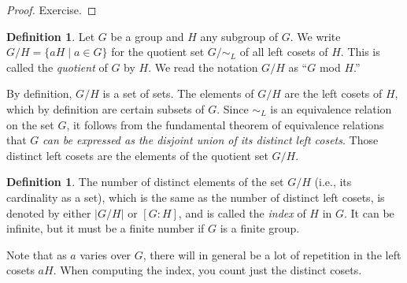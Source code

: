 \documentclass[11pt,oneside]{article}
\theoremstyle{definition}
\newtheorem{defn}[thm]{Definition}
\begin{document}
\begin{proof} 
  Exercise.
\end{proof}

\begin{defn}
Let $G$ be a group and $H$ any subgroup of $G$. We write $G/H = \{ aH
\mid a \in G \}$ for the quotient set $G/\!\!\sim_L$ of all left
cosets of $H$. This is called the \emph{quotient} of $G$ by $H$. We
read the notation $G/H$ as ``$G$ mod $H$.''
\end{defn}

By definition, $G/H$ is a set of sets. The elements of $G/H$ are the
left cosets of $H$, which by definition are certain subsets of $G$.
Since $\sim_L$ is an equivalence relation on the set $G$, it follows
from the fundamental theorem of equivalence relations that $G$
\emph{can be expressed as the disjoint union of its distinct left
  cosets}. Those distinct left cosets are the elements of the quotient
set $G/H$.


\begin{defn}
The number of distinct elements of the set $G/H$ (i.e., its
cardinality as a set), which is the same as the number of distinct
left cosets, is denoted by either $|G/H|$ or $[G:H]$, and is called
the {\em index} of $H$ in $G$. It can be infinite, but it must be a
finite number if $G$ is a finite group.
\end{defn}

Note that as $a$ varies over $G$, there will in general be a lot of
repetition in the left cosets $aH$. When computing the index, you
count just the distinct cosets. 
\end{document}
